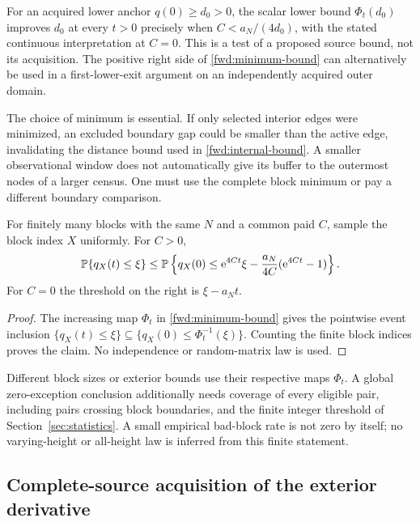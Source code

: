 For an acquired lower anchor $q(0)\ge d_0>0$, the scalar lower bound
$\Phi_t(d_0)$ improves $d_0$ at every $t>0$ precisely when
$C<a_N/(4d_0)$, with the stated continuous interpretation at $C=0$.
This is a test of a proposed source bound, not its acquisition. The
positive right side of \eqref{fwd:minimum-bound} can alternatively be used
in a first-lower-exit argument on an independently acquired outer domain.

The choice of minimum is essential. If only selected interior edges
were minimized, an excluded boundary gap could be smaller than the active
edge, invalidating the distance bound used in
\eqref{fwd:internal-bound}. A smaller observational window does not
automatically give its buffer to the outermost nodes of a larger census.
One must use the complete block minimum or pay a different boundary
comparison.

\begin{corollary}
\label{fwd:empirical}
For finitely many blocks with the same $N$ and a common paid $C$, sample
the block index $X$ uniformly. For $C>0$,
\begin{equation}
 \mathbb P\{q_X(t)\le\xi\}
 \le\mathbb P\left\{q_X(0)\le
       \mathrm e^{4Ct}\xi-\frac{a_N}{4C}(\mathrm e^{4Ct}-1)\right\}.
 \label{fwd:tail}
\end{equation}
For $C=0$ the threshold on the right is $\xi-a_Nt$.
\end{corollary}
\begin{proof}
The increasing map $\Phi_t$ in \eqref{fwd:minimum-bound} gives the
pointwise event inclusion
$\{q_X(t)\le\xi\}\subseteq\{q_X(0)\le\Phi_t^{-1}(\xi)\}$.
Counting the finite block indices proves the claim. No independence or
random-matrix law is used.
\end{proof}

Different block sizes or exterior bounds use their respective maps
$\Phi_t$. A global zero-exception conclusion additionally needs coverage
of every eligible pair, including pairs crossing block boundaries, and
the finite integer threshold of Section~\ref{sec:statistics}. A small
empirical bad-block rate is not zero by itself; no varying-height or
all-height law is inferred from this finite statement.

\subsection{Complete-source acquisition of the exterior derivative}

